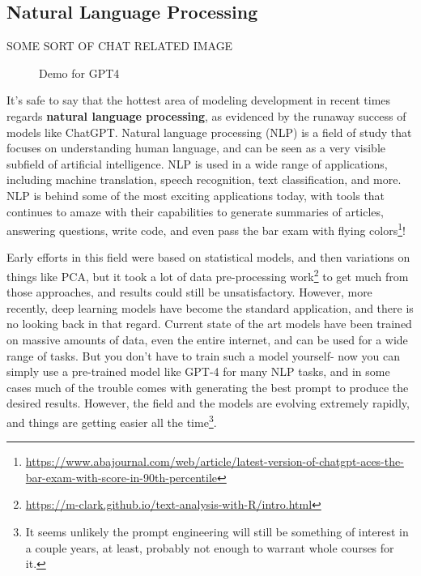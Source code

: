 \documentclass[
  letterpaper,
]{krantz}
\DeclareRobustCommand{\href}[2]{#2\footnote{\url{#1}}}
\begin{document}
\subsection{Natural Language
Processing}\label{natural-language-processing}

SOME SORT OF CHAT RELATED IMAGE

\begin{figure}[H]


\caption{\label{fig-gpt4}Demo for GPT4}

\end{figure}%

It's safe to say that the hottest area of modeling development in recent
times regards \textbf{natural language processing}, as evidenced by the
runaway success of models like ChatGPT. Natural language processing
(NLP) is a field of study that focuses on understanding human language,
and can be seen as a very visible subfield of artificial intelligence.
NLP is used in a wide range of applications, including machine
translation, speech recognition, text classification, and more. NLP is
behind some of the most exciting applications today, with tools that
continues to amaze with their capabilities to generate summaries of
articles, answering questions, write code, and even
\href{https://www.abajournal.com/web/article/latest-version-of-chatgpt-aces-the-bar-exam-with-score-in-90th-percentile}{pass
the bar exam with flying colors}!

Early efforts in this field were based on statistical models, and then
variations on things like PCA, but it took a lot of
\href{https://m-clark.github.io/text-analysis-with-R/intro.html}{data
pre-processing work} to get much from those approaches, and results
could still be unsatisfactory. However, more recently, deep learning
models have become the standard application, and there is no looking
back in that regard. Current state of the art models have been trained
on massive amounts of data, even the entire internet, and can be used
for a wide range of tasks. But you don't have to train such a model
yourself- now you can simply use a pre-trained model like GPT-4 for many
NLP tasks, and in some cases much of the trouble comes with generating
the best prompt to produce the desired results. However, the field and
the models are evolving extremely rapidly, and things are getting easier
all the time\footnote{It seems unlikely the prompt engineering will
  still be something of interest in a couple years, at least, probably
  not enough to warrant whole courses for it.}.
\end{document}
